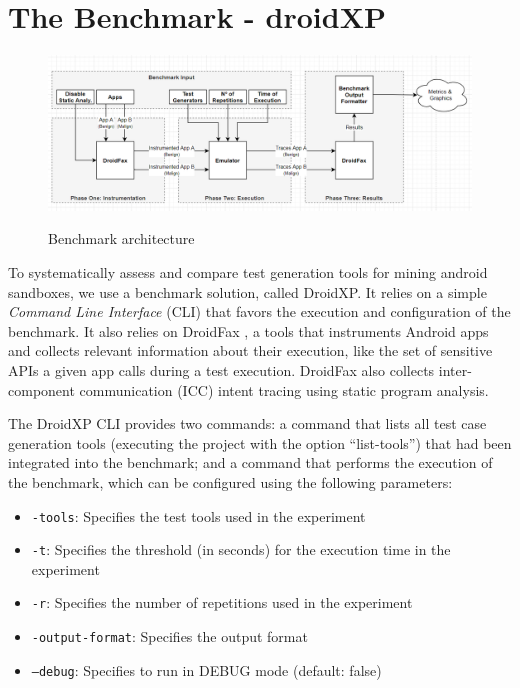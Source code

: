 \section{The Benchmark - droidXP}

\begin{figure}[ht]
  \includegraphics[width=1\textwidth]{images/benchmark4.png}
  \label{benchArq}
  \caption{Benchmark architecture}
  \label{fig:benchArq}
\end{figure}


To systematically assess and compare test generation tools for mining android sandboxes, we use a benchmark solution, called DroidXP. It relies on a simple \emph{Command Line Interface} (CLI) that favors the execution and configuration of the benchmark. It also
relies on DroidFax \cite{cai2016understanding}, a tools that instruments Android apps and collects relevant information about their execution, like the set of sensitive APIs a given
app calls during a test execution. DroidFax also collects inter-component communication (ICC)  intent  tracing  using  static  program analysis.

The DroidXP CLI provides two commands: a command that lists all test case
generation tools (executing the project with the option ``list-tools'') that had been
integrated into the benchmark; and a command that performs the execution of the benchmark,
which can be configured using the following parameters:

\begin{itemize}
    \item \texttt{-tools}: Specifies the test tools used in the experiment
    \item \texttt{-t}: Specifies the threshold (in seconds) for the execution time in the experiment
    \item \texttt{-r}: Specifies the number of repetitions used in the experiment
    \item \texttt{-output-format}: Specifies the output format
    \item \texttt{--debug}: Specifies to run in DEBUG mode (default: false)    
\end{itemize}

